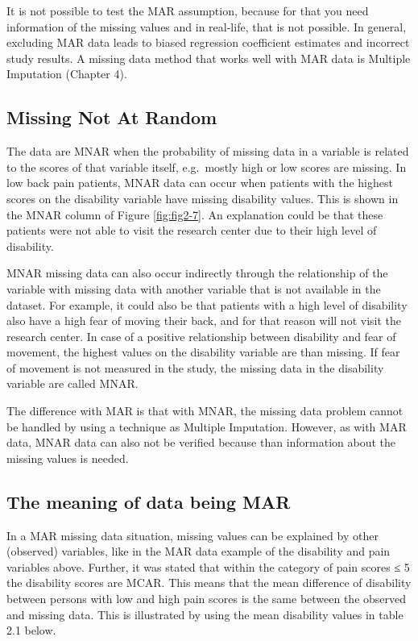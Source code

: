 \documentclass[
]{book}
\begin{document}
It is not possible to test the MAR assumption, because for that you need information of the missing values and in real-life, that is not possible. In general, excluding MAR data leads to biased regression coefficient estimates and incorrect study results. A missing data method that works well with MAR data is Multiple Imputation (Chapter 4).

\hypertarget{missing-not-at-random}{%
\subsection{Missing Not At Random}\label{missing-not-at-random}}

The data are MNAR when the probability of missing data in a variable is related to the scores of that variable itself, e.g.~mostly high or low scores are missing. In low back pain patients, MNAR data can occur when patients with the highest scores on the disability variable have missing disability values. This is shown in the MNAR column of Figure \ref{fig:fig2-7}. An explanation could be that these patients were not able to visit the research center due to their high level of disability.

MNAR missing data can also occur indirectly through the relationship of the variable with missing data with another variable that is not available in the dataset. For example, it could also be that patients with a high level of disability also have a high fear of moving their back, and for that reason will not visit the research center. In case of a positive relationship between disability and fear of movement, the highest values on the disability variable are than missing. If fear of movement is not measured in the study, the missing data in the disability variable are called MNAR.

The difference with MAR is that with MNAR, the missing data problem cannot be handled by using a technique as Multiple Imputation. However, as with MAR data, MNAR data can also not be verified because than information about the missing values is needed.

\hypertarget{the-meaning-of-data-being-mar}{%
\subsection{The meaning of data being MAR}\label{the-meaning-of-data-being-mar}}

In a MAR missing data situation, missing values can be explained by other (observed) variables, like in the MAR data example of the disability and pain variables above. Further, it was stated that within the category of pain scores ≤ 5 the disability scores are MCAR. This means that the mean difference of disability between persons with low and high pain scores is the same between the observed and missing data. This is illustrated by using the mean disability values in table 2.1 below.
\end{document}
